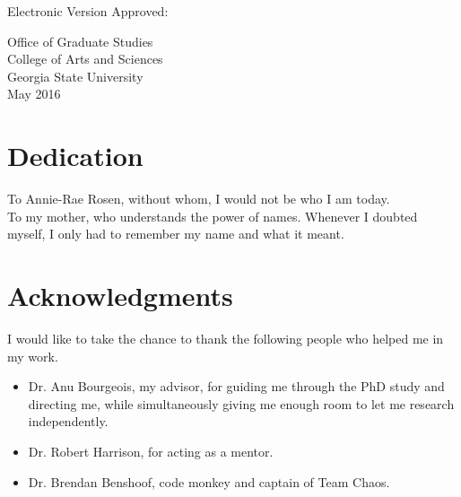 \documentclass[11pt,letterpaper]{report}
\begin{document}
	
	\noindent
	Electronic Version Approved:\\
	\vspace{1cm}
	
	\noindent
	Office of Graduate Studies \\
	College of Arts and Sciences \\
	Georgia State University\\
	May 2016 
	
	\newpage
	\pagestyle{plain}
	
	\chapter*{Dedication}
	To Annie-Rae Rosen, without whom, I would not be who I am today.
	\\
	To my mother, who understands the power of names.
	Whenever I doubted myself, I only had to remember my name and what it meant.
	
	\chapter*{Acknowledgments}	
	I would like to take the chance to thank the following people who helped me in my work.
	
	\begin{itemize}
		\item Dr. Anu Bourgeois, my advisor, for guiding me through the PhD study and directing me, while simultaneously giving me enough room to let me research independently.
		\item Dr. Robert Harrison, for acting as a mentor.
		\item Dr. Brendan Benshoof, code monkey and captain of Team Chaos.
		
		
		
		
	\end{itemize}
	
	
	\setcounter{tocdepth}{4}
	
	\tableofcontents
	\listoftables
	\listoffigures
	\newpage
	

	\clearpage
	 
	 
	
	 
	
	
	
	 
	
	
	
	
\end{document}
